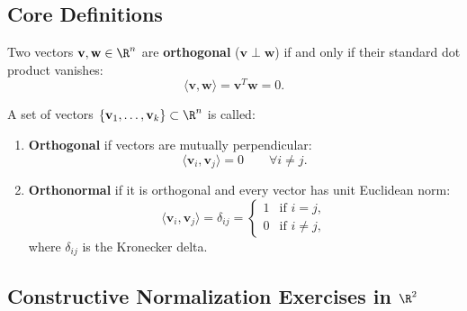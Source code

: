 \subsection{Core Definitions}

\begin{definition}
Two vectors $\mathbf{v}, \mathbf{w} \in \R^n$ are \textbf{orthogonal} ($\mathbf{v} \perp \mathbf{w}$) if and only if their standard dot product vanishes:
\begin{equation}
    \langle \mathbf{v}, \mathbf{w} \rangle = \mathbf{v}^T \mathbf{w} = 0.
\end{equation}
\end{definition}

\begin{definition}
A set of vectors $\{\mathbf{v}_1, \dots, \mathbf{v}_k\} \subset \R^n$ is called:
\mbox{}\par\nopagebreak
\begin{enumerate}
    \item \textbf{Orthogonal} if vectors are mutually perpendicular:
    \begin{equation}
        \langle \mathbf{v}_i, \mathbf{v}_j \rangle = 0 \qquad \forall i \neq j.
    \end{equation}
    \item \textbf{Orthonormal} if it is orthogonal and every vector has unit Euclidean norm:
    \begin{equation}
        \langle \mathbf{v}_i, \mathbf{v}_j \rangle = \delta_{ij} = \begin{cases} 1 & \text{if } i = j, \\ 0 & \text{if } i \neq j, \end{cases}
    \end{equation}
    where $\delta_{ij}$ is the Kronecker delta.
\end{enumerate}
\end{definition}

\subsection{Constructive Normalization Exercises in \texorpdfstring{$\R^2$}{R2}}

